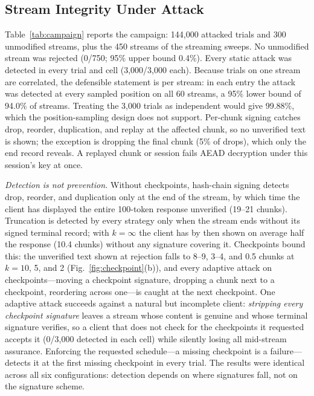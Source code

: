 \documentclass[conference]{IEEEtran}
\begin{document}


\subsection{Stream Integrity Under Attack}\label{sec:res-campaign}
Table~\ref{tab:campaign} reports the campaign: 144,000 attacked trials and 300 unmodified streams,
plus the 450 streams of the streaming sweeps. No unmodified stream was rejected (0/750; 95\% upper bound
0.4\%). Every static attack was detected in every trial and cell (3,000/3,000 each). Because trials on one
stream are correlated, the defensible statement is per stream: in each entry the attack was detected at
every sampled position on all 60 streams, a 95\% lower bound of 94.0\% of streams. Treating the 3,000 trials as
independent would give 99.88\%, which the position-sampling design does not support. Per-chunk signing catches drop, reorder, duplication, and replay at the affected chunk, so no
unverified text is shown; the exception is dropping the final chunk (5\% of drops), which only the end
record reveals. A replayed chunk or session fails AEAD decryption under this session's key at once.

\emph{Detection is not prevention.} Without checkpoints, hash-chain signing detects drop, reorder, and
duplication only at the end of the stream, by which time the client has displayed the entire 100-token
response unverified (19--21 chunks). Truncation is detected by every strategy only when the stream ends
without its signed terminal record; with $k{=}\infty$ the client has by then shown on average half the
response (10.4 chunks) without any signature covering it. Checkpoints bound this: the unverified text
shown at rejection falls to 8--9, 3--4, and 0.5 chunks at $k=10$, 5, and 2
(Fig.~\ref{fig:checkpoint}(b)), and every adaptive attack on checkpoints---moving a checkpoint
signature, dropping a chunk next to a checkpoint, reordering across one---is caught at the next
checkpoint. One adaptive attack succeeds against a natural but incomplete client: \emph{stripping every
checkpoint signature} leaves a stream whose content is genuine and whose terminal signature verifies,
so a client that does not check for the checkpoints it requested accepts it (0/3,000 detected in each
cell) while silently losing all mid-stream assurance. Enforcing the requested schedule---a missing
checkpoint is a failure---detects it at the first missing checkpoint in every trial. The results were
identical across all six configurations: detection depends on where signatures fall, not on the
signature scheme.
\end{document}
